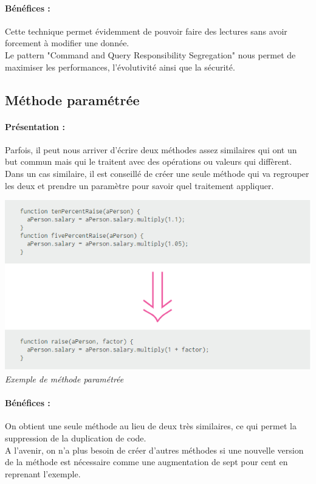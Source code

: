 \documentclass[a4paper,twoside,12pt,openright]{report}
\begin{document}
\paragraph{Bénéfices :}
Cette technique permet évidemment de pouvoir faire des lectures sans avoir forcement à modifier une donnée.\\
Le pattern "Command and Query Responsibility Segregation" nous permet de maximiser les performances, l'évolutivité ainsi que la sécurité.\\

\newpage

\subsection{Méthode paramétrée}
\paragraph{Présentation :}
Parfois, il peut nous arriver d'écrire deux méthodes assez similaires qui ont un but commun mais qui le traitent avec des opérations ou valeurs qui diffèrent. Dans un cas similaire, il est conseillé de créer une seule méthode qui va regrouper les deux et prendre un paramètre pour savoir quel traitement appliquer.\\

\begin{center}
\includegraphics[scale=1]{Image/Methode_Parametre.png}\\
\itshape{Exemple de méthode paramétrée \cite{ref8}}
\end{center}

\paragraph{Bénéfices :}
On obtient une seule méthode au lieu de deux très similaires, ce qui permet la suppression de la duplication de code.\\
A l'avenir, on n'a plus besoin de créer d'autres méthodes si une nouvelle version de la méthode est nécessaire comme une augmentation de sept pour cent en reprenant l'exemple.\\
\end{document}
